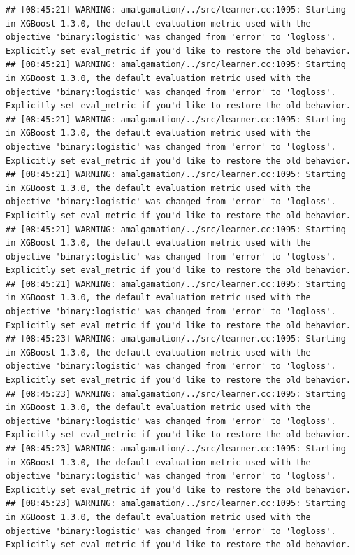 \documentclass[
]{scrbook}
\begin{document}
\begin{verbatim}
## [08:45:21] WARNING: amalgamation/../src/learner.cc:1095: Starting in XGBoost 1.3.0, the default evaluation metric used with the objective 'binary:logistic' was changed from 'error' to 'logloss'. Explicitly set eval_metric if you'd like to restore the old behavior.
## [08:45:21] WARNING: amalgamation/../src/learner.cc:1095: Starting in XGBoost 1.3.0, the default evaluation metric used with the objective 'binary:logistic' was changed from 'error' to 'logloss'. Explicitly set eval_metric if you'd like to restore the old behavior.
## [08:45:21] WARNING: amalgamation/../src/learner.cc:1095: Starting in XGBoost 1.3.0, the default evaluation metric used with the objective 'binary:logistic' was changed from 'error' to 'logloss'. Explicitly set eval_metric if you'd like to restore the old behavior.
## [08:45:21] WARNING: amalgamation/../src/learner.cc:1095: Starting in XGBoost 1.3.0, the default evaluation metric used with the objective 'binary:logistic' was changed from 'error' to 'logloss'. Explicitly set eval_metric if you'd like to restore the old behavior.
## [08:45:21] WARNING: amalgamation/../src/learner.cc:1095: Starting in XGBoost 1.3.0, the default evaluation metric used with the objective 'binary:logistic' was changed from 'error' to 'logloss'. Explicitly set eval_metric if you'd like to restore the old behavior.
## [08:45:21] WARNING: amalgamation/../src/learner.cc:1095: Starting in XGBoost 1.3.0, the default evaluation metric used with the objective 'binary:logistic' was changed from 'error' to 'logloss'. Explicitly set eval_metric if you'd like to restore the old behavior.
## [08:45:23] WARNING: amalgamation/../src/learner.cc:1095: Starting in XGBoost 1.3.0, the default evaluation metric used with the objective 'binary:logistic' was changed from 'error' to 'logloss'. Explicitly set eval_metric if you'd like to restore the old behavior.
## [08:45:23] WARNING: amalgamation/../src/learner.cc:1095: Starting in XGBoost 1.3.0, the default evaluation metric used with the objective 'binary:logistic' was changed from 'error' to 'logloss'. Explicitly set eval_metric if you'd like to restore the old behavior.
## [08:45:23] WARNING: amalgamation/../src/learner.cc:1095: Starting in XGBoost 1.3.0, the default evaluation metric used with the objective 'binary:logistic' was changed from 'error' to 'logloss'. Explicitly set eval_metric if you'd like to restore the old behavior.
## [08:45:23] WARNING: amalgamation/../src/learner.cc:1095: Starting in XGBoost 1.3.0, the default evaluation metric used with the objective 'binary:logistic' was changed from 'error' to 'logloss'. Explicitly set eval_metric if you'd like to restore the old behavior.

\end{verbatim}
\end{document}
